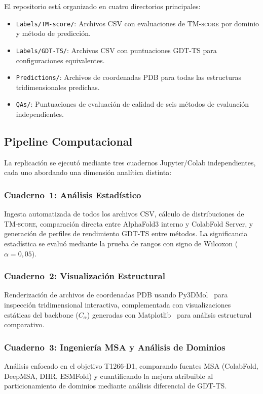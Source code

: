 \documentclass[10pt,twocolumn,a4paper]{article}
\newcommand{\tmscore}{\textsc{TM-score}}
\newcommand{\gdtts}{\textsc{GDT-TS}}
\newcommand{\afthree}{AlphaFold3}
\begin{document}
El repositorio está organizado en cuatro directorios principales:

\begin{itemize}
    \item \texttt{Labels/TM-score/}: Archivos CSV con evaluaciones de \tmscore{} por dominio y método de predicción.
    \item \texttt{Labels/GDT-TS/}: Archivos CSV con puntuaciones \gdtts{} para configuraciones equivalentes.
    \item \texttt{Predictions/}: Archivos de coordenadas PDB para todas las estructuras tridimensionales predichas.
    \item \texttt{QAs/}: Puntuaciones de evaluación de calidad de seis métodos de evaluación independientes.
\end{itemize}

\subsection{Pipeline Computacional}

La replicación se ejecutó mediante tres cuadernos Jupyter/Colab independientes, cada uno abordando una dimensión analítica distinta:

\subsubsection{Cuaderno~1: Análisis Estadístico}
Ingesta automatizada de todos los archivos CSV, cálculo de distribuciones de \tmscore{}, comparación directa entre \afthree{} interno y ColabFold Server, y generación de perfiles de rendimiento \gdtts{} entre métodos. La significancia estadística se evaluó mediante la prueba de rangos con signo de Wilcoxon ($\alpha = 0{,}05$).

\subsubsection{Cuaderno~2: Visualización Estructural}
Renderización de archivos de coordenadas PDB usando Py3DMol~\cite{rego2015py3dmol} para inspección tridimensional interactiva, complementada con visualizaciones estáticas del backbone ($C_\alpha$) generadas con Matplotlib~\cite{hunter2007matplotlib} para análisis estructural comparativo.

\subsubsection{Cuaderno~3: Ingeniería MSA y Análisis de Dominios}
Análisis enfocado en el objetivo T1266-D1, comparando fuentes MSA (ColabFold, DeepMSA, DHR, ESMFold) y cuantificando la mejora atribuible al particionamiento de dominios mediante análisis diferencial de \gdtts{}.
\end{document}
